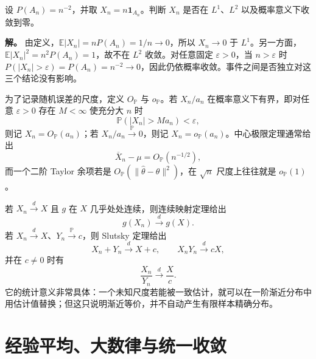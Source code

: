 \begin{workedexample}[收敛方式的区别]
设 \(P(A_n)=n^{-2}\)，并取 \(X_n=n\mathbf1_{A_n}\)。判断 \(X_n\) 是否在 \(L^1\)、\(L^2\) 以及概率意义下收敛到零。

\textbf{解。} 由定义，\(\mathbb E|X_n|=nP(A_n)=1/n\to0\)，所以 \(X_n\to0\) 于 \(L^1\)。另一方面，\(\mathbb E|X_n|^2=n^2P(A_n)=1\)，故不在 \(L^2\) 收敛。对任意固定 \(\varepsilon>0\)，当 \(n>\varepsilon\) 时 \(P(|X_n|>\varepsilon)=P(A_n)=n^{-2}\to0\)，因此仍依概率收敛。事件之间是否独立对这三个结论没有影响。
\end{workedexample}

为了记录随机误差的尺度，定义 $O_{\mathbb P}$ 与 $o_{\mathbb P}$。若 $X_n/a_n$ 在概率意义下有界，即对任意 $\varepsilon>0$ 存在 $M<\infty$ 使充分大 $n$ 时
\[
 \mathbb P(|X_n|>Ma_n)<\varepsilon,
\]
则记 $X_n=O_{\mathbb P}(a_n)$；若 $X_n/a_n\xrightarrow{\mathbb P}0$，则记 $X_n=o_{\mathbb P}(a_n)$。中心极限定理通常给出
\[
 \overline X_n-\mu=O_{\mathbb P}(n^{-1/2}),
\]
而一个二阶 Taylor 余项若是 $O_{\mathbb P}(\|\widehat\theta-\theta\|^2)$，在 $\sqrt n$ 尺度上往往就是 $o_{\mathbb P}(1)$。

若 $X_n\xrightarrow{d} X$ 且 $g$ 在 $X$ 几乎处处连续，则连续映射定理给出
\[
 g(X_n)\xrightarrow{d} g(X).
\]
若 $X_n\xrightarrow{d} X$、$Y_n\xrightarrow{\mathbb P} c$，则 Slutsky 定理给出
\[
 X_n+Y_n\xrightarrow{d} X+c,
 \qquad
 X_nY_n\xrightarrow{d} cX,
\]
并在 $c\ne0$ 时有
\[
 \frac{X_n}{Y_n}\xrightarrow{d}\frac{X}{c}.
\]
它的统计意义非常具体：一个未知尺度若能被一致估计，就可以在一阶渐近分布中用估计值替换；但这只说明渐近等价，并不自动产生有限样本精确分布。

\section{经验平均、大数律与统一收敛}

